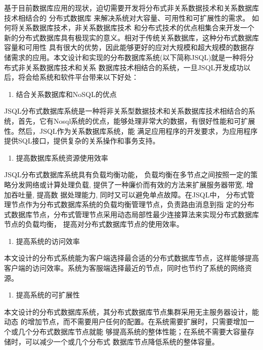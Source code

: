 基于目前数据库应用的现状，迫切需要开发将分布式非关系数据技术和关系数据库技术相结合的
分布式数据库
来解决系统对大容量、可用性和可扩展性的需求。
如何将关系数据库技术，非关系数据库技术
和分布式技术的优点相集合来开发一个新的分布式数据库具有极现实的意义。相对于传统关系数据库，这种分布式数据库容量和可用性
具有很大的优势，因此能够更好的应对大规模和超大规模的数据存储需求的应用。本文设计和实现的分布数据库系统(以下简称JSQL)就是一种将分布式非关系数据库技术和关系
数据库技术相结合的系统，一旦JSQL开发成功以后，将会给系统和软件平台带来以下好处：

\begin{enumerate}
	\item 结合关系数据库和NoSQL的优点
\end{enumerate}

	JSQL分布式数据库系统是一种将非关系型数据技术和关系数据库技术相结合的系统，首先，它有Nosql系统的优点，能够处理非常大的数据，有很好性能和可扩展性。然后，JSQL作为关系数据库系统，能
	满足应用程序的开发要求，为应用程序提供SQL接口，提供复杂的关系操作和事务支持。
	
	\begin{enumerate}[resume]
		\item 提高数据库系统资源使用效率
	\end{enumerate}

	JSQL分布式数据库系统具有负载均衡功能，
	负载均衡在多节点之间按照一定的策略分发网络或计算处理负载,
	提供了一种廉价而有效的方法来扩展服务器带宽, 增加吞吐量, 提高数
	据处理能力, 同时又可以避免单点故障。在JSQL中，
	分布式管理节点作为分布式数据库系统的负载均衡管理节点，负责路由消息到指
	定的分布式数据库节点，分布式管理节点采用动态局部性最少连接算法来实现分布式数据库节点的负载均衡，
	提高对分布式数据库节点的使用效率。
	
	\begin{enumerate}[resume]
		\item 提高系统的访问效率
	\end{enumerate}

	本文设计的分布式系统能为客户端选择最合适的分布式数据库节点，这样能够提高客户端的访问效率。系统为客服端选择最近的节点，同时也节约了系统的网络资源。
	
	\begin{enumerate}[resume]
		\item 提高系统的可扩展性
	\end{enumerate}

	本文设计的分布式数据库系统，其分布式数据库节点集群采用无主服务器设计，能动态
	的增加节点，而不需要用户任何的配置。在系统需要扩展时，只需要增加一个或几个分布式数据库节点就能
	够提高系统的整体性能；在系统不需要大容量存储时，可以减少一个或几个分布式
	数据库节点降低系统的整体容量。
	
